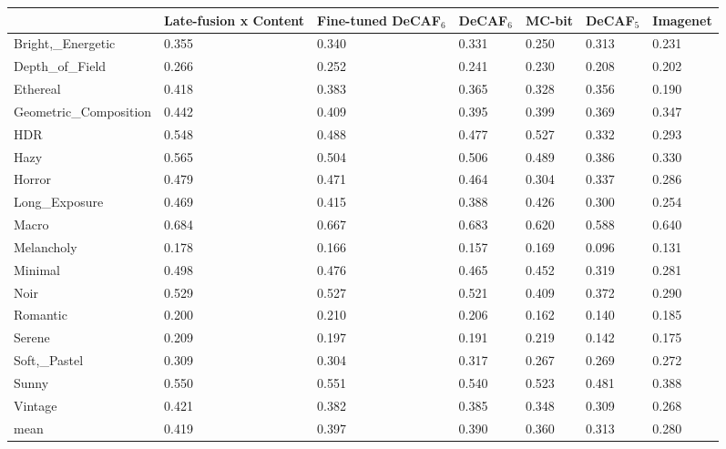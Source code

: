 
\begin{tabular}{lllllll}
\toprule
{} & Late-fusion x Content & Fine-tuned DeCAF$_6$ & DeCAF$_6$ & MC-bit & DeCAF$_5$ & Imagenet \\
\midrule
Bright,\_Energetic     &                 0.355 &              0.340 &   0.331 &  0.250 &   0.313 &    0.231 \\
Depth\_of\_Field        &                 0.266 &              0.252 &   0.241 &  0.230 &   0.208 &    0.202 \\
Ethereal              &                 0.418 &              0.383 &   0.365 &  0.328 &   0.356 &    0.190 \\
Geometric\_Composition &                 0.442 &              0.409 &   0.395 &  0.399 &   0.369 &    0.347 \\
HDR                   &                 0.548 &              0.488 &   0.477 &  0.527 &   0.332 &    0.293 \\
Hazy                  &                 0.565 &              0.504 &   0.506 &  0.489 &   0.386 &    0.330 \\
Horror                &                 0.479 &              0.471 &   0.464 &  0.304 &   0.337 &    0.286 \\
Long\_Exposure         &                 0.469 &              0.415 &   0.388 &  0.426 &   0.300 &    0.254 \\
Macro                 &                 0.684 &              0.667 &   0.683 &  0.620 &   0.588 &    0.640 \\
Melancholy            &                 0.178 &              0.166 &   0.157 &  0.169 &   0.096 &    0.131 \\
Minimal               &                 0.498 &              0.476 &   0.465 &  0.452 &   0.319 &    0.281 \\
Noir                  &                 0.529 &              0.527 &   0.521 &  0.409 &   0.372 &    0.290 \\
Romantic              &                 0.200 &              0.210 &   0.206 &  0.162 &   0.140 &    0.185 \\
Serene                &                 0.209 &              0.197 &   0.191 &  0.219 &   0.142 &    0.175 \\
Soft,\_Pastel          &                 0.309 &              0.304 &   0.317 &  0.267 &   0.269 &    0.272 \\
Sunny                 &                 0.550 &              0.551 &   0.540 &  0.523 &   0.481 &    0.388 \\
Vintage               &                 0.421 &              0.382 &   0.385 &  0.348 &   0.309 &    0.268 \\
\midrule
mean                 &                 0.419 &              0.397 &   0.390 &  0.360 &   0.313 &    0.280 \\
\bottomrule
\end{tabular}
